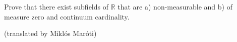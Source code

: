 Prove that there exist subfields of $\mathbb R$ that are
a) non-measurable and
b) of measure zero and continuum cardinality.

(translated by Miklós Maróti)